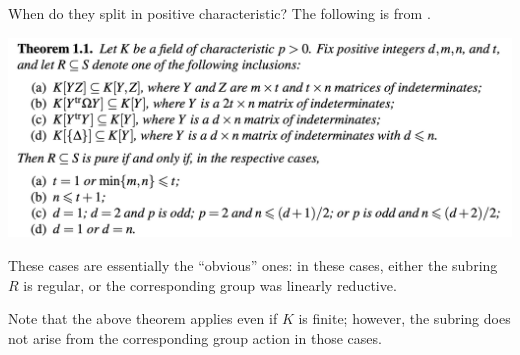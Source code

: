 \documentclass{beamer}
\newenvironment{blurb}
{\par\tiny}
{\par\addvspace{\bigskipamount}}
\begin{document}

	\begin{frame}{When do they split in positive characteristic?}
		The following is from \cite{HochsterJeffriesPandeySingh}. \pause

		\includegraphics[width=\textwidth]{figs/HJPS_main_theorem.png}

		These cases are essentially the ``obvious'' ones: in these cases, either the subring $R$ is regular, or the corresponding group was linearly reductive. \pause 
		\begin{blurb}
			Note that the above theorem applies even if $K$ is finite; however, the subring does not arise from the corresponding group action in those cases.
		\end{blurb}
	\end{frame}
\end{document}
